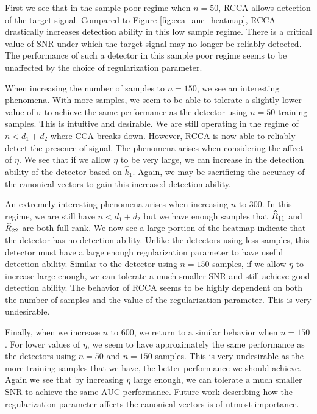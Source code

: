 First we see that in the sample poor regime when $n=50$, RCCA allows detection of the
target signal. Compared to Figure \ref{fig:cca_auc_heatmap}, RCCA drastically increases
detection ability in this low sample regime. There is a critical value of SNR under which
the target signal may no longer be reliably detected. The performance of such a detector
in this sample poor regime seems to be unaffected by the choice of regularization
parameter.

When increasing the number of samples to $n=150$, we see an interesting phenomena. With
more samples, we seem to be able to tolerate a slightly lower value of $\sigma$ to achieve
the same performance as the detector using $n=50$ training samples. This is intuitive and
desirable. We are still operating in the regime of $n<d_1+d_2$ where CCA breaks
down. However, RCCA is now able to reliably detect the presence of signal. The phenomena
arises when considering the affect of $\eta$. We see that if we allow $\eta$ to be very
large, we can increase in the detection ability of the \naive detector based on
$\widehat{k}_1$. Again, we may be sacrificing the accuracy of the canonical vectors to
gain this increased detection ability.

An extremely interesting phenomena arises when increasing $n$ to 300. In this regime, we
are still have $n<d_1+d_2$ but we have enough samples that $\widehat{R}_{11}$ and $\widehat{R}_{22}$ are both
full rank. We now see a large portion of the heatmap indicate that the detector has no
detection ability. Unlike the detectors using less samples, this detector must have a
large enough regularization parameter to have useful detection ability. Similar to the
detector using $n=150$ samples, if we allow $\eta$ to increase large enough, we can
tolerate a much smaller SNR and still achieve good detection ability. The behavior of RCCA
seems to be highly dependent on both the number of samples and the value of the
regularization parameter. This is very undesirable.

Finally, when we increase $n$ to 600, we return to a similar behavior when $n=150$. For
lower values of $\eta$, we seem to have approximately the same performance as the
detectors using $n=50$ and $n=150$ samples. This is very undesirable as the more training
samples that we have, the better performance we should achieve. Again we see that by
increasing $\eta$ large enough, we can tolerate a much smaller SNR to achieve the same AUC
performance. Future work describing how the regularization parameter affects the canonical
vectors is of utmost importance.

